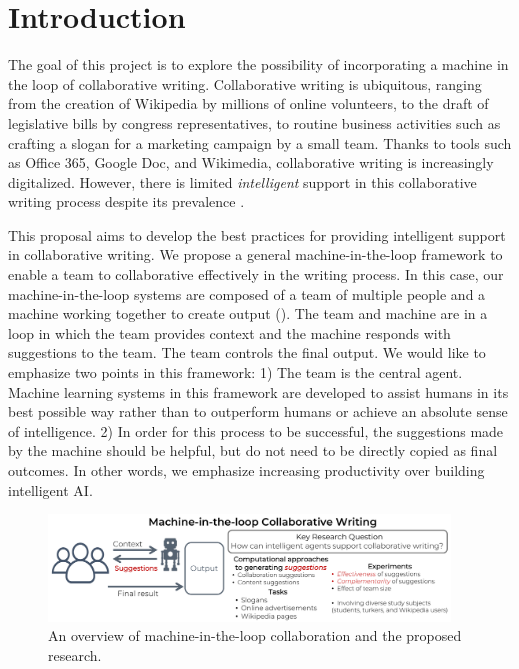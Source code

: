 
\section{Introduction}

The goal of this project is to explore the possibility of incorporating a machine in the loop of collaborative writing.
Collaborative writing is ubiquitous, ranging from the creation of Wikipedia by millions of online volunteers, to the draft of legislative bills by congress representatives, to routine business activities such as crafting a slogan for a marketing campaign by a small team.
Thanks to tools such as Office 365, Google Doc, and Wikimedia, collaborative writing is increasingly digitalized.
However, there is limited {\em intelligent} support in this collaborative writing process despite its prevalence \citep{gehrmann2015deploying}.


This proposal aims to develop the best practices for providing intelligent support in collaborative writing.
We propose a general machine-in-the-loop framework to enable a team to collaborative effectively in the writing process.
In this case, our machine-in-the-loop systems are composed of a team of multiple people and a machine working together to create output (). The team and machine are in a loop in which the team provides context and the machine responds with suggestions to the team. The team controls the final output.
We would like to emphasize two points in this framework:
1)  The team is the central agent. Machine learning systems in this framework are developed to assist humans in its best possible way rather than to outperform humans or achieve an absolute sense of intelligence.
2)  In order for this process to be successful, the suggestions made by the machine should be helpful, but do not need to be directly copied as final outcomes.
In other words, we emphasize increasing productivity over building intelligent AI.

\begin{figure}[t]
\centering
\includegraphics[width=0.95\textwidth]{illustration.pdf}
\caption{An overview of machine-in-the-loop collaboration and the proposed research.}
\label{fig:task}
\end{figure}

